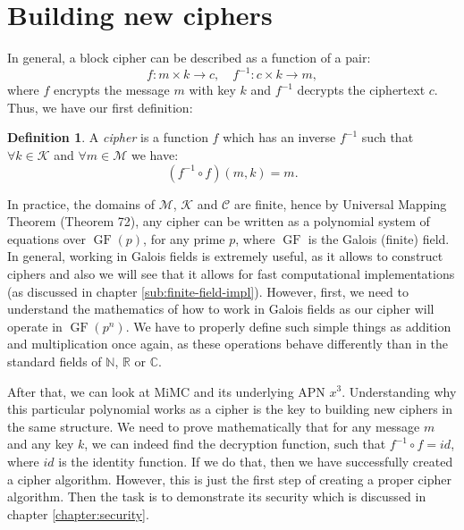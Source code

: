 \documentclass{Resources/UoBLab1}
\theoremstyle{definition}
\newtheorem{definition}[theorem]{Definition}
\begin{document}
\section{Building new ciphers}
In general, a block cipher can be described as a function of a pair:
\[
f : m \times k \to c,\quad f^{-1} : c \times k \to m,
\]
where $f$ encrypts the message $m$ with key $k$ and $f^{-1}$ decrypts the ciphertext $c$. Thus, we have our first definition:
\begin{definition}\label{def:cipher}
    A \textit{cipher} is a function $f$ which has an inverse $f^{-1}$ such that \(\forall k \in \mathcal{K}\) and \(\forall m \in \mathcal{M}\) we have:
    \[
        (f^{-1} \circ f)(m, k) = m.
    \]
\end{definition}
In practice, the domains of $\mathcal{M}$, $\mathcal{K}$ and $\mathcal{C}$ are finite, hence by Universal Mapping Theorem (Theorem 72\cite{CryptanalysisBook}), any cipher can be written as a polynomial system of equations over $\operatorname{GF}(p)$, for any prime $p$, where $\operatorname{GF}$ is the Galois (finite) field. In general, working in Galois fields is extremely useful, as it allows to construct ciphers and also we will see that it allows for fast computational implementations (as discussed in chapter \ref{sub:finite-field-impl}). However, first, we need to understand the mathematics of how to work in Galois fields as our cipher will operate in $\operatorname{GF}(p^n)$. We have to properly define such simple things as addition and multiplication once again, as these operations behave differently than in the standard fields of $\mathbb{N}$, $\mathbb{R}$ or $\mathbb{C}$.

After that, we can look at MiMC and its underlying APN $x^3$. Understanding why this particular polynomial works as a cipher is the key to building new ciphers in the same structure. We need to prove mathematically that for any message $m$ and any key $k$, we can indeed find the decryption function, such that \(f^{-1} \circ f = id\), where $id$ is the identity function. If we do that, then we have successfully created a cipher algorithm. However, this is just the first step of creating a proper cipher algorithm. Then the task is to demonstrate its security which is discussed in chapter \ref{chapter:security}.
\end{document}
